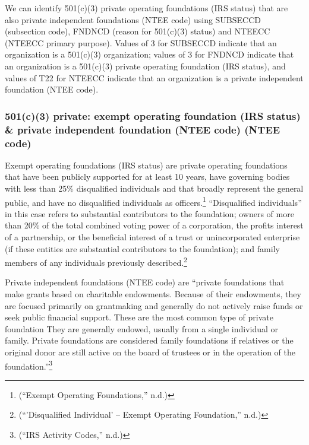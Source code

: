 \documentclass[
  letterpaper,
  DIV=11,
  numbers=noendperiod,
  oneside]{scrreprt}
\begin{document}
We can identify 501(c)(3) private operating foundations (IRS status)
that are also private independent foundations (NTEE code) using SUBSECCD
(subsection code), FNDNCD (reason for 501(c)(3) status) and NTEECC
(NTEECC primary purpose). Values of 3 for SUBSECCD indicate that an
organization is a 501(c)(3) organization; values of 3 for FNDNCD
indicate that an organization is a 501(c)(3) private operating
foundation (IRS status), and values of T22 for NTEECC indicate that an
organization is a private independent foundation (NTEE code).

\hypertarget{c3-private-exempt-operating-foundation-irs-status-private-independent-foundation-ntee-code-ntee-code}{%
\subsubsection{501(c)(3) private: exempt operating foundation (IRS
status) \& private independent foundation (NTEE code) (NTEE
code)}\label{c3-private-exempt-operating-foundation-irs-status-private-independent-foundation-ntee-code-ntee-code}}

Exempt operating foundations (IRS status) are private operating
foundations that have been publicly supported for at least 10 years,
have governing bodies with less than 25\% disqualified individuals and
that broadly represent the general public, and have no disqualified
individuals as officers.\footnote{({``Exempt Operating Foundations,''}
  n.d.)} ``Disqualified individuals'' in this case refers to substantial
contributors to the foundation; owners of more than 20\% of the total
combined voting power of a corporation, the profits interest of a
partnership, or the beneficial interest of a trust or unincorporated
enterprise (if these entities are substantial contributors to the
foundation); and family members of any individuals previously
described.\footnote{({``'Disqualified Individual' -- Exempt Operating
  Foundation,''} n.d.)}

Private independent foundations (NTEE code) are ``private foundations
that make grants based on charitable endowments. Because of their
endowments, they are focused primarily on grantmaking and generally do
not actively raise funds or seek public financial support. These are the
most common type of private foundation They are generally endowed,
usually from a single individual or family. Private foundations are
considered family foundations if relatives or the original donor are
still active on the board of trustees or in the operation of the
foundation.''\footnote{({``IRS Activity Codes,''} n.d.)}
\end{document}
